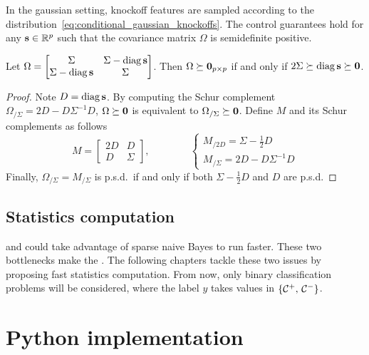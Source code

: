 In the gaussian setting,
knockoff features are sampled according to the distribution~\ref{eq:conditional_gaussian_knockoffs}.
The control guarantees hold for any $\mathbf{s} \in \mathbb{R}^p$ such that the covariance matrix $\Omega$ is semidefinite positive.
\begin{proposition}\label{prop:omega_psd}
    Let $\Omega = \begin{bmatrix}
        \Sigma & \Sigma - \operatorname*{diag} \mathbf{s}\\
        \Sigma - \operatorname*{diag} \mathbf{s} & \Sigma
    \end{bmatrix}$.
    Then $\Omega \succeq \mathbf{0}_{p \times p}$ if and only if $2\Sigma \succeq \operatorname*{diag} \mathbf{s} \succeq \mathbf{0}$.
\end{proposition}
\begin{proof}
    Note $D = \operatorname*{diag}\mathbf{s}$.
    By computing the Schur complement~\cite{schur_complement}
    $\Omega_{/\Sigma} = 2D - D\Sigma^{-1}D$,
    $\Omega \succeq \mathbf{0}$ is equivalent to $\Omega_{/\Sigma} \succeq \mathbf{0}$.
    Define $M$ and its Schur complements as follows
    \begin{equation*}
        M = \begin{bmatrix}
            2D & D\\
            D & \Sigma
        \end{bmatrix}
        ,\qquad\qquad
        \begin{cases*}
            M_{/2D} = \Sigma - \frac{1}{2}D\\
            M_{/\Sigma} = 2D - D\Sigma^{-1}D
        \end{cases*}
    \end{equation*}
    Finally, $\Omega_{/\Sigma} = M_{/\Sigma}$ is p.s.d.\ if and only if both $\Sigma - \frac{1}{2}D$ and $D$ are p.s.d.
\end{proof}

\subsection{Statistics computation}\label{subsec:bot_stats}

and could take advantage of sparse naive Bayes to run faster.
\bigbreak
These two bottlenecks make the .
The following chapters tackle these two issues by proposing fast statistics computation.
From now, only binary classification problems will be considered, where the label $y$ takes values
in $\left\{ \mathcal{C}^+,\, \mathcal{C}^- \right\}$.

\section{Python implementation}\label{sec:python_implementation}

